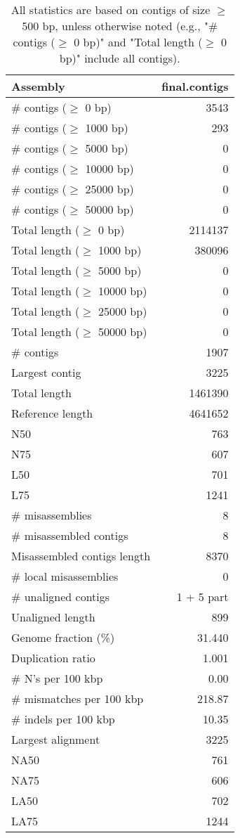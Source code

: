 \documentclass[12pt,a4paper]{article}
\begin{document}
\begin{table}[ht]
\begin{center}
\caption{All statistics are based on contigs of size $\geq$ 500 bp, unless otherwise noted (e.g., "\# contigs ($\geq$ 0 bp)" and "Total length ($\geq$ 0 bp)" include all contigs).}
\begin{tabular}{|l*{1}{|r}|}
\hline
Assembly & final.contigs \\ \hline
\# contigs ($\geq$ 0 bp) & 3543 \\ \hline
\# contigs ($\geq$ 1000 bp) & 293 \\ \hline
\# contigs ($\geq$ 5000 bp) & 0 \\ \hline
\# contigs ($\geq$ 10000 bp) & 0 \\ \hline
\# contigs ($\geq$ 25000 bp) & 0 \\ \hline
\# contigs ($\geq$ 50000 bp) & 0 \\ \hline
Total length ($\geq$ 0 bp) & 2114137 \\ \hline
Total length ($\geq$ 1000 bp) & 380096 \\ \hline
Total length ($\geq$ 5000 bp) & 0 \\ \hline
Total length ($\geq$ 10000 bp) & 0 \\ \hline
Total length ($\geq$ 25000 bp) & 0 \\ \hline
Total length ($\geq$ 50000 bp) & 0 \\ \hline
\# contigs & 1907 \\ \hline
Largest contig & 3225 \\ \hline
Total length & 1461390 \\ \hline
Reference length & 4641652 \\ \hline
N50 & 763 \\ \hline
N75 & 607 \\ \hline
L50 & 701 \\ \hline
L75 & 1241 \\ \hline
\# misassemblies & 8 \\ \hline
\# misassembled contigs & 8 \\ \hline
Misassembled contigs length & 8370 \\ \hline
\# local misassemblies & 0 \\ \hline
\# unaligned contigs & 1 + 5 part \\ \hline
Unaligned length & 899 \\ \hline
Genome fraction (\%) & 31.440 \\ \hline
Duplication ratio & 1.001 \\ \hline
\# N's per 100 kbp & 0.00 \\ \hline
\# mismatches per 100 kbp & 218.87 \\ \hline
\# indels per 100 kbp & 10.35 \\ \hline
Largest alignment & 3225 \\ \hline
NA50 & 761 \\ \hline
NA75 & 606 \\ \hline
LA50 & 702 \\ \hline
LA75 & 1244 \\ \hline
\end{tabular}
\end{center}
\end{table}
\end{document}
